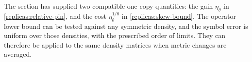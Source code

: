 The section has supplied two compatible one-copy quantities: the
gain $\eta_\theta$ in \eqref{replicas:relative-pin}, and the cost
$\eta_\theta^{1/8}$ in \eqref{replicas:skew-bound}.  The operator lower
bound can be tested against any symmetric density, and the symbol
error is uniform over those densities, with the prescribed order of
limits.  They can therefore be applied to the same density matrices
when metric changes are averaged.
